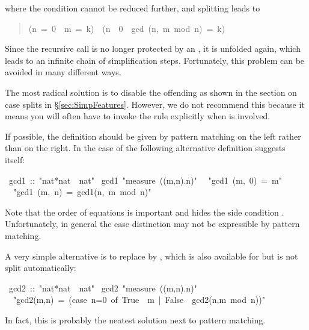 \begin{isabelle}
\begin{isamarkuptext}
\begin{quote}
\end{quote}
where the condition cannot be reduced further, and splitting leads to
\begin{quote}

\begin{isabelle}%
(\mbox{n}\ =\ 0\ {\isasymlongrightarrow}\ \mbox{m}\ =\ \mbox{k})\ {\isasymand}\ (\mbox{n}\ {\isasymnoteq}\ 0\ {\isasymlongrightarrow}\ gcd\ (\mbox{n},\ \mbox{m}\ mod\ \mbox{n})\ =\ \mbox{k})
\end{isabelle}%

\end{quote}
Since the recursive call  is no longer protected by
an , it is unfolded again, which leads to an infinite chain of
simplification steps. Fortunately, this problem can be avoided in many
different ways.

The most radical solution is to disable the offending
 as shown in the section on case splits in
\S\ref{sec:SimpFeatures}.
However, we do not recommend this because it means you will often have to
invoke the rule explicitly when  is involved.

If possible, the definition should be given by pattern matching on the left
rather than  on the right. In the case of  the
following alternative definition suggests itself:%
\end{isamarkuptext}%
\ gcd1\ ::\ {"}nat*nat\ {\isasymRightarrow}\ nat{"}\isanewline
{}\ gcd1\ {"}measure\ ({\isasymlambda}(m,n).n){"}\isanewline
\ \ {"}gcd1\ (m,\ 0)\ =\ m{"}\isanewline
\ \ {"}gcd1\ (m,\ n)\ =\ gcd1(n,\ m\ mod\ n){"}%
\begin{isamarkuptext}%
\noindent
Note that the order of equations is important and hides the side condition
. Unfortunately, in general the case distinction
may not be expressible by pattern matching.

A very simple alternative is to replace  by , which
is also available for  but is not split automatically:%
\end{isamarkuptext}%
\ gcd2\ ::\ {"}nat*nat\ {\isasymRightarrow}\ nat{"}\isanewline
{}\ gcd2\ {"}measure\ ({\isasymlambda}(m,n).n){"}\isanewline
\ \ {"}gcd2(m,n)\ =\ (case\ n=0\ of\ True\ {\isasymRightarrow}\ m\ |\ False\ {\isasymRightarrow}\ gcd2(n,m\ mod\ n)){"}%
\begin{isamarkuptext}%
\noindent
In fact, this is probably the neatest solution next to pattern matching.


\end{isamarkuptext}
\end{isabelle}
